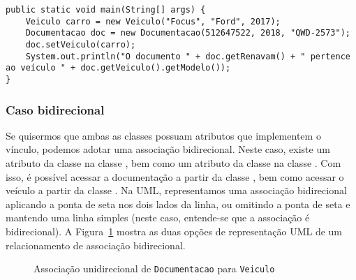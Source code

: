 \begin{verbatim}
public static void main(String[] args) {
	Veiculo carro = new Veiculo("Focus", "Ford", 2017);
	Documentacao doc = new Documentacao(512647522, 2018, "QWD-2573");
	doc.setVeiculo(carro);
	System.out.println("O documento " + doc.getRenavam() + " pertence ao veículo " + doc.getVeiculo().getModelo());
}
\end{verbatim}

\subsubsection{Caso bidirecional}

Se quisermos que ambas as classes possuam atributos que implementem o vínculo, podemos adotar uma associação bidirecional. Neste caso, existe um atributo da classe  na classe , bem como um atributo da classe  na classe . Com isso, é possível acessar a documentação a partir da classe , bem como acessar o veículo a partir da classe . Na UML, representamos uma associação bidirecional aplicando a ponta de seta nos dois lados da linha, ou omitindo a ponta de seta e mantendo uma linha simples (neste caso, entende-se que a associação é bidirecional). A Figura~\ref{fig:associacao-bidirecional} mostra as duas opções de representação UML de um relacionamento de associação bidirecional.

\begin{figure}[h]
	\centering
	
	
	\caption{Associação unidirecional de \texttt{Documentacao} para \texttt{Veiculo}}
	\label{fig:associacao-bidirecional}
\end{figure}

